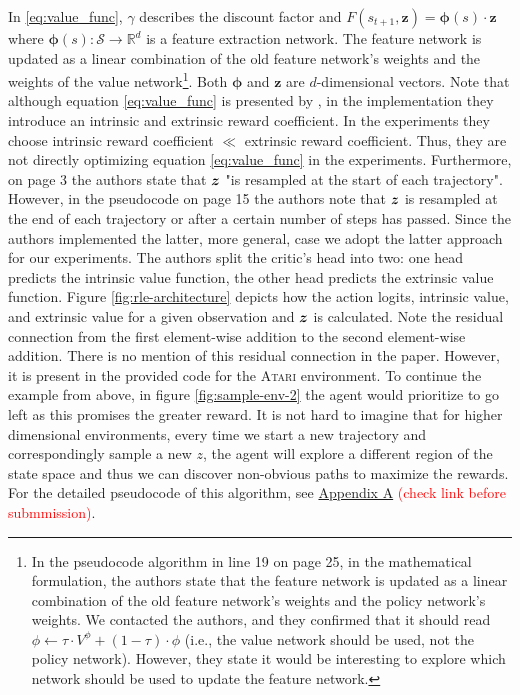 \documentclass[10pt]{article} %
\begin{document}
\noindent In \eqref{eq:value_func}, $\gamma$ describes the discount factor and $F(s_{t+1}, \textbf{z}) =  \boldsymbol{\phi}(s) \cdot \textbf{z}$ where $\boldsymbol{\phi}(s): \mathcal{S} \rightarrow \mathbb{R}^{d}$ is a feature extraction network. The feature network is updated as a linear combination of the old feature network's weights and the weights of the value network\footnote{In the pseudocode algorithm in line 19 on page 25, in the mathematical formulation, the authors state that the feature network is updated as a linear combination of the old feature network's weights and the policy network's weights. We contacted the authors, and they confirmed that it should read $\phi \leftarrow \tau \cdot V^\phi + (1 - \tau ) \cdot \phi$ (i.e., the value network should be used, not the policy network). However, they state it would be interesting to explore which network should be used to update the feature network.}. Both $\boldsymbol{\phi}$ and $\textbf{z}$ are $d$-dimensional vectors. Note that although equation \ref{eq:value_func} is presented by \cite{rle-paper}, in the implementation they introduce an intrinsic and extrinsic reward coefficient. In the experiments they choose intrinsic reward coefficient $\ll$ extrinsic reward coefficient. Thus, they are not directly optimizing equation \ref{eq:value_func} in the experiments. Furthermore, on page 3 the authors state that ${\bm{z}}$ "is resampled at the start of each trajectory". However, in the pseudocode on page 15 the authors note that ${\bm{z}}$ is resampled at the end of each trajectory or after a certain number of steps has passed. Since the authors implemented the latter, more general, case we adopt the latter approach for our experiments. The authors split the critic's head into two: one head predicts the intrinsic value function, the other head predicts the extrinsic value function. Figure \ref{fig:rle-architecture} depicts how the action logits, intrinsic value, and extrinsic value for a given observation and ${\bm{z}}$ is calculated. Note the residual connection from the first element-wise addition to the second element-wise addition. There is no mention of this residual connection in the paper. However, it is present in the provided code for the \textsc{Atari} environment. To continue the example from above, in figure \ref{fig:sample-env-2} the agent would prioritize to go left as this promises the greater reward. It is not hard to imagine that for higher dimensional environments, every time we start a new trajectory and correspondingly sample a new $z$, the agent will explore a different region of the state space and thus we can discover non-obvious paths to maximize the rewards. For the detailed pseudocode of this algorithm, see \hyperlink{algo-rle}{Appendix A} \textcolor{red}{(check link before submmission)}.
\end{document}
